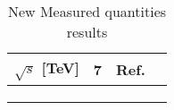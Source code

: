 \begin{table}
\centering
\begin{tabular}{c | l | l | c}
\hline
$\sqrt{s}$ [TeV]		&7													&Ref.\\
\hline
\hline
\color{red}{dN$_{\phi\phi}$/dy}	&\color{red}{0.00150 $\pm$0.00007	$\pm$0.00007}		&\color{red}{This work}\\
\hline
\color{red}{$\gamma_{\phi}$}	&\color{red}{0.058 $\pm$0.006	$\pm$0.01}			&\color{red}{This work}\\
\hline
\color{red}{$\sigma^2_{\phi}$}	&\color{red}{0.0348 $\pm$0.0014	$\pm$0.0014}		&\color{red}{This work}\\
\hline

\end{tabular}
\caption{New Measured quantities results}
\label{22}
\end{table}








